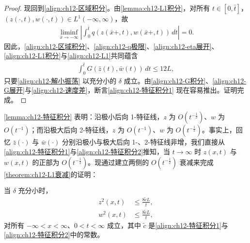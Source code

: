 \documentclass[../../main.tex]{subfiles}
\begin{document}
\begin{proof}
现回到\eqref{align:ch12-区域积分}。由\cref{lemma:ch12-L1积分}，对所有 $t\in[0,\bar t]$，$(z(\cdot,t),w(\cdot,t))\in L^1(-\infty,\infty)$，故
\begin{align}
\liminf_{\bar x\to-\infty}\left|\int_0^{\bar t}q(z(\bar x+,t),w(\bar x+,t))\,dt\right|=0.
\label{align:ch12-q极限}
\end{align}
因此，\eqref{align:ch12-区域积分}、\eqref{align:ch12-q极限}、\eqref{align:ch12-eta展开}、\eqref{align:ch12-L1积分}与\eqref{align:ch12-L1}共同蕴含
\begin{align}
\int_0^{\bar t}G(\bar z(t),\bar w(t))\,dt\leqslant 12L,
\label{align:ch12-G积分}
\end{align}
只要\eqref{align:ch12-解小振荡} 以充分小的 $\delta$ 成立。由\eqref{align:ch12-G积分}、\eqref{align:ch12-G展开}与\eqref{align:ch12-速度差}，断言\eqref{align:ch12-特征积分1} 现在容易推出。证明完成。
\end{proof}

\cref{lemma:ch12-特征积分} 表明：沿极小后向 1-特征线，$z$ 为 $O(t^{-\frac12})$、$w$ 为 $O(t^{-1})$；而沿极大后向 2-特征线，$z$ 为 $O(t^{-1})$、$w$ 为 $O(t^{-\frac12})$。事实上，回忆 $\bar z(\cdot)$ 与 $\bar w(\cdot)$ 分别沿极小与极大后向 1-、2-特征线非增，我们直接从\eqref{align:ch12-特征积分1}与\eqref{align:ch12-特征积分2}推知，当 $t\to\infty$ 时 $z(x,t)$ 与 $w(x,t)$ 的正部为 $O(t^{-\frac12})$。现通过建立两侧的 $O(t^{-\frac12})$ 衰减来完成\cref{theorem:ch12-L1衰减}的证明：

\begin{lemma}\label{lemma:ch12-逐点衰减}
当 $\delta$ 充分小时，
\begin{align}
z^2(x,t)&\leqslant\frac{8\tilde c L}{t},
\label{align:ch12-逐点衰减1}\\
w^2(x,t)&\leqslant\frac{8\tilde c L}{t},
\label{align:ch12-逐点衰减2}
\end{align}
对所有 $-\infty<x<\infty$、$0<t<\infty$ 成立，其中 $\tilde c$ 是\eqref{align:ch12-特征积分1}与\eqref{align:ch12-特征积分2}中的常数。
\end{lemma}
\end{document}
